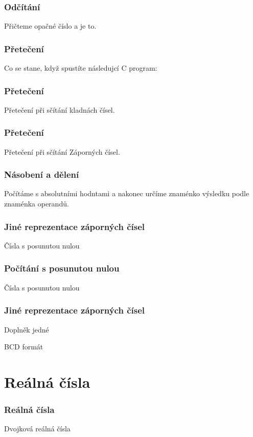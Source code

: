\documentclass{beamer}
\begin{document}
\begin{frame}
\frametitle{Odčítání}

Přičteme opačné číslo a je to.
\end{frame}

\begin{frame}
\frametitle{Přetečení}

Co se stane, když spustíte následujcí C program:

\end{frame}

\begin{frame}
\frametitle{Přetečení}

Přetečení při sčítání kladnách čísel.
\end{frame}

\begin{frame}
\frametitle{Přetečení}

Přetečení při sčítání Záporných čísel.
\end{frame}

\begin{frame}
\frametitle{Násobení a dělení}

Počítáme s absolutními hodntami a nakonec určíme znaménko výsledku podle znaménka operandů.
\end{frame}

\begin{frame}
\frametitle{Jiné reprezentace záporných čísel}

Čísla s posunutou nulou
\end{frame}

\begin{frame}
\frametitle{Počítání s posunutou nulou}

Čísla s posunutou nulou
\end{frame}


\begin{frame}
\frametitle{Jiné reprezentace záporných čísel}

Doplněk jedné

BCD formát
\end{frame}


\section{Reálná čísla}


\begin{frame}
\frametitle{Reálná čísla}

Dvojková reálná čísla

\end{frame}
\end{document}
